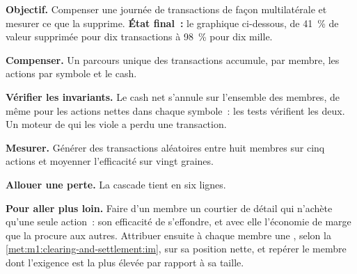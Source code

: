 \begin{tutorial}
\textbf{Objectif.} Compenser une journée de transactions de façon multilatérale et mesurer ce que la 
supprime. \textbf{État final~:} le graphique ci-dessous, de 41~\% de valeur supprimée pour
dix transactions à 98~\% pour dix mille.
\begin{tutsteps}
\item \textbf{Compenser.} Un parcours unique des transactions accumule, par membre, les actions
par symbole et le cash.
\label{lst:m1:clearing-and-settlement:net}
\item \textbf{Vérifier les invariants.} Le cash net s'annule sur l'ensemble des membres,
de même pour les actions nettes dans chaque symbole~: les tests vérifient les deux. Un moteur
de  qui les viole a perdu une transaction.
\item \textbf{Mesurer.} Générer des transactions aléatoires entre huit membres sur
cinq actions et moyenner l'efficacité sur vingt graines.
\item \textbf{Allouer une perte.} La cascade tient en six lignes.
\label{lst:m1:clearing-and-settlement:wf}
\end{tutsteps}
\textbf{Pour aller plus loin.} Faire d'un membre un courtier de détail qui n'achète qu'une
seule action~: son efficacité de  s'effondre, et avec elle l'économie de marge que
la  procure aux autres. Attribuer ensuite à chaque membre une ,
selon la \cref{met:m1:clearing-and-settlement:im}, sur sa position nette, et repérer le membre
dont l'exigence est la plus élevée par rapport à sa taille.
\end{tutorial}

